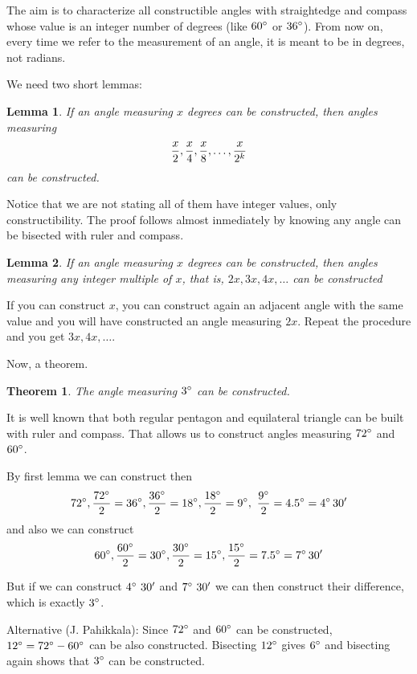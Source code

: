 \documentclass[12pt]{article}
\newtheorem{lem}{Lemma}
\newtheorem{thm}{Theorem}
\begin{document}
The aim is to characterize all constructible angles with straightedge and compass whose value is an integer number of degrees (like $60\sp\circ$ or $36\sp\circ$).
From now on, every time we refer to the measurement of an angle, it is meant to be in degrees, not radians.

We need two short lemmas:

\begin{lem}
If an angle measuring $x$ degrees can be constructed, then angles measuring
\[\frac x2,\frac x4,\frac x8,\ldots,\frac{x}{2\sp k}\]
can be constructed.
\end{lem}

Notice that we are not stating all of them have integer values, only constructibility. The proof follows almost inmediately by knowing any angle can be bisected with ruler and compass.

\begin{lem}
If an angle measuring $x$ degrees can be constructed, then angles measuring any integer multiple of $x$, that is, $2x,3x,4x,\ldots$ can be constructed
\end{lem}

If you can construct $x$, you can construct again an adjacent angle with the same value and you will have constructed an angle measuring $2x$. Repeat the procedure and you get $3x,4x,\ldots$.

\bigskip

Now, a theorem.

\begin{thm}
The angle measuring $3\sp\circ$ can be constructed.
\end{thm}

It is well known that both regular pentagon and equilateral triangle can be built with ruler and compass. That allows us to construct angles measuring $72\sp\circ$ and $60\sp\circ$.


By first lemma we can construct then 
\[72\sp\circ, \frac{72\sp\circ}{2}=36\sp\circ, \frac{36\sp\circ}{2}=18\sp\circ,
\frac{18\sp\circ}{2}=9\sp\circ,\
\frac{9\sp\circ}{2}=4.5\sp\circ=4\sp\circ\, 30'
\]
and also we can construct
\[
60\sp\circ,\frac{60\sp\circ}{2}=30\sp\circ,
\frac{30\sp\circ}{2}=15\sp\circ,
\frac{15\sp\circ}{2}=7.5\sp\circ = 7\sp\circ\, 30'
\]

But if we can construct $4\sp\circ\ 30'$ and $7\sp\circ\ 30'$ we can then construct their difference, which is exactly $3\sp\circ$.


Alternative (J. Pahikkala): Since $72\sp\circ$ and $60\sp\circ$ can be constructed, $12\sp\circ=72\sp\circ-60\sp\circ$ can be also constructed. Bisecting $12\sp\circ$ gives $6\sp\circ$ and bisecting again shows that $3\sp\circ$ can be constructed.
\end{document}
